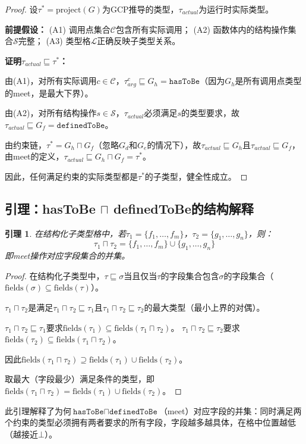 \documentclass[UTF8]{article}
\newtheorem{lemma}[theorem]{引理}
\newcommand{\hasToBe}{\texttt{hasToBe}}
\newcommand{\definedToBe}{\texttt{definedToBe}}
\begin{document}
\begin{proof}
设$\tau^* = \text{project}(G)$为GCP推导的类型，$\tau_{actual}$为运行时实际类型。

\textbf{前提假设：}
(A1) 调用点集合$\mathcal{C}$包含所有实际调用；
(A2) 函数体内的结构操作集合$\mathcal{S}$完整；
(A3) 类型格$\mathcal{L}$正确反映子类型关系。

\textbf{证明$\tau_{actual} \sqsubseteq \tau^*$：}

由(A1)，对所有实际调用$c \in \mathcal{C}$，$\tau_{arg}^c \sqsubseteq G_h = \hasToBe$（因为$G_h$是所有调用点类型的meet，是最大下界）。

由(A2)，对所有结构操作$s \in \mathcal{S}$，$\tau_{actual}$必须满足$s$的类型要求，故$\tau_{actual} \sqsubseteq G_f = \definedToBe$。

由约束链，$\tau^* = G_h \sqcap G_f$（忽略$G_d$和$G_e$的情况下），故$\tau_{actual} \sqsubseteq G_h$且$\tau_{actual} \sqsubseteq G_f$，由meet的定义，$\tau_{actual} \sqsubseteq G_h \sqcap G_f = \tau^*$。

因此，任何满足约束的实际类型都是$\tau^*$的子类型，健全性成立。
\end{proof}

\subsection{引理：hasToBe $\sqcap$ definedToBe的结构解释}

\begin{lemma}
在结构化子类型格中，若$\tau_1 = \{f_1, \ldots, f_m\}$，$\tau_2 = \{g_1, \ldots, g_n\}$，则：
$$\tau_1 \sqcap \tau_2 = \{f_1, \ldots, f_m\} \cup \{g_1, \ldots, g_n\}$$
即meet操作对应字段集合的并集。
\end{lemma}

\begin{proof}
在结构化子类型中，$\tau \sqsubseteq \sigma$当且仅当$\tau$的字段集合包含$\sigma$的字段集合（$\text{fields}(\sigma) \subseteq \text{fields}(\tau)$）。

$\tau_1 \sqcap \tau_2$是满足$\tau_1 \sqcap \tau_2 \sqsubseteq \tau_1$且$\tau_1 \sqcap \tau_2 \sqsubseteq \tau_2$的最大类型（最小上界的对偶）。

$\tau_1 \sqcap \tau_2 \sqsubseteq \tau_1$要求$\text{fields}(\tau_1) \subseteq \text{fields}(\tau_1 \sqcap \tau_2)$。
$\tau_1 \sqcap \tau_2 \sqsubseteq \tau_2$要求$\text{fields}(\tau_2) \subseteq \text{fields}(\tau_1 \sqcap \tau_2)$。

因此$\text{fields}(\tau_1 \sqcap \tau_2) \supseteq \text{fields}(\tau_1) \cup \text{fields}(\tau_2)$。

取最大（字段最少）满足条件的类型，即$\text{fields}(\tau_1 \sqcap \tau_2) = \text{fields}(\tau_1) \cup \text{fields}(\tau_2)$。
\end{proof}

此引理解释了为何$\hasToBe \sqcap \definedToBe$（meet）对应字段的并集：同时满足两个约束的类型必须拥有两者要求的所有字段，字段越多越具体，在格中位置越低（越接近$\bot$）。
\end{document}
